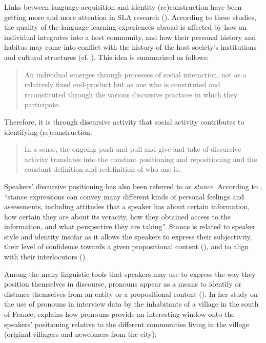 \documentclass[output=paper]{langscibook}
\begin{document}
Links between language acquisition and identity (re)construction have been getting more and more attention in SLA research (\citealt{Block2007a, Grieve2013,Grieve2015, Compiegne2020}). According to these studies, the quality of the language learning experiences abroad is affected by how an individual integrates into a host community, and how their personal history and habitus may come into conflict with the history of the host society’s institutions and cultural structures (cf. \citealt{Coleman2013,Coleman2015}). This idea is summarized as follows: 

\begin{quote}
An individual emerges through processes of social interaction, not as a relatively fixed end-product but as one who is constituted and reconstituted through the various discursive practices in which they participate. \hbox{}\hfill\hbox{\citep[46]{DaviesHarré1990}} 

\end{quote}

Therefore, it is through discursive activity that social activity contributes to identifying (re)construction: 

\begin{quote}
In a sense, the ongoing push and pull and give and take of discursive activity translates into the constant positioning and repositioning and the constant definition and redefinition of who one is.\hbox{}\hfill\hbox{\citep[20]{Block2007b}}

\end{quote}

Speakers’ discursive positioning has also been referred to as \textit{stance}. According to \citet[99]{Biber2006}, “stance expressions can convey many different kinds of personal feelings and assessments, including attitudes that a speaker has about certain information, how certain they are about its veracity, how they obtained access to the information, and what perspective they are taking”. Stance is related to speaker style and identity insofar as it allows the speakers to express their subjectivity, their level of confidence towards a given propositional content (\citealt{BucholtzHall2005}), and to align with their interlocutors (\citealt{DuBois2007}).

Among the many linguistic tools that speakers may use to express the way they position themselves in discourse, pronouns appear as a means to identify or distance themselves from an entity or a propositional content (\citealt{Langhans1996, Hidalgo-DowningEtAl2014}). In her study on the use of pronouns in interview data by the inhabitants of a village in the south of France, \citet{Langhans1996} explains how pronouns provide an interesting window onto the speakers’ positioning relative to the different communities living in the village (original villagers and newcomers from the city):
\end{document}

